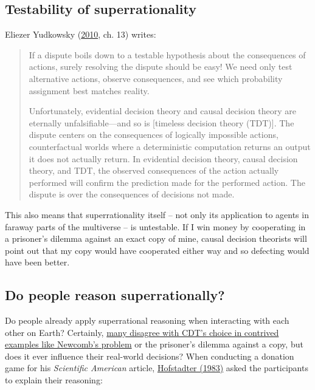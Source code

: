 \subsection{Testability of
superrationality}\label{testability-of-superrationality}

Eliezer Yudkowsky
(\href{https://intelligence.org/files/TDT.pdf}{2010}, ch. 13)
writes:

\begin{quote}
If a dispute boils down to a testable hypothesis about the consequences
of actions, surely resolving the dispute should be easy! We need only
test alternative actions, observe consequences, and see which
probability assignment best matches reality.

Unfortunately, evidential decision theory and causal decision theory are
eternally unfalsifiable---and so is {[}timeless decision theory
(TDT){]}. The dispute centers on the consequences of logically
impossible actions, counterfactual worlds where a deterministic
computation returns an output it does not actually return. In evidential
decision theory, causal decision theory, and TDT, the observed
consequences of the action actually performed will confirm the
prediction made for the performed action. The dispute is over the
consequences of decisions not made.
\end{quote}

This also means that superrationality itself -- not only its application
to agents in faraway parts of the multiverse -- is untestable. If I win money
by cooperating in a prisoner's dilemma against an exact copy of mine,
causal decision theorists will point out that my copy would have cooperated
either way and so defecting would have been better.

\hypertarget{do-people-reason-superrationally}{\subsection{Do people
reason superrationally?}\label{do-people-reason-superrationally}}

Do people already apply superrational reasoning when interacting with
each other on Earth? Certainly,
\href{https://casparoesterheld.com/2017/06/27/a-survey-of-polls-on-newcombs-problem/}{many
disagree with CDT's choice in contrived examples like Newcomb's
problem} or the prisoner's dilemma against a copy, but does it ever
influence their real-world decisions? When conducting a donation game
for his \emph{Scientific American} article,
\href{https://www.gwern.net/docs/1985-hofstadter\#dilemmas-for-superrational-thinkers-leading-up-to-a-luring-lottery}{Hofstadter
(1983)} asked the participants to explain their reasoning:

